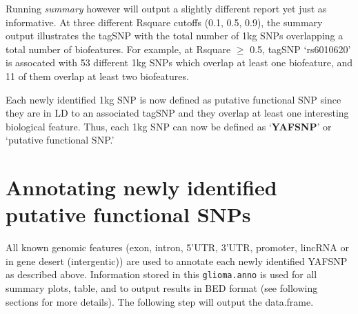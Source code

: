 \documentclass[12pt,fullpage]{article}
\newcommand{\Robject}[1]{{\texttt{#1}}}
\newcommand{\Rmethod}[1]{{\textit{#1}}}
\begin{document}
Running \Rmethod{summary} however will output a slightly different report yet
just as informative. At three different Rsquare cutoffs (0.1, 0.5, 0.9), the
summary output illustrates the tagSNP with the total number of 1kg SNPs
overlapping a total number of biofeatures. For example, at Rsquare $\ge$ 0.5,
tagSNP `rs6010620' is assocated with 53 different 1kg SNPs which overlap at
least one biofeature, and 11 of them overlap at least two biofeatures.

Each newly identified 1kg SNP is now defined as putative functional SNP since
they are in LD to an associated tagSNP and they overlap at least one interesting
biological feature. Thus, each 1kg SNP can now be defined as
`\textbf{YAFSNP}' or `putative functional SNP.'

\section{Annotating newly identified putative functional SNPs}

All known genomic features (exon, intron, 5'UTR, 3'UTR, promoter, lincRNA or in
gene desert (intergentic)) are used to annotate each newly identified YAFSNP
as described above. Information stored in this \Robject{glioma.anno} is used for
all summary plots, table, and to output results in BED format (see following
sections for more details). The following step will output the data.frame.
\end{document}
